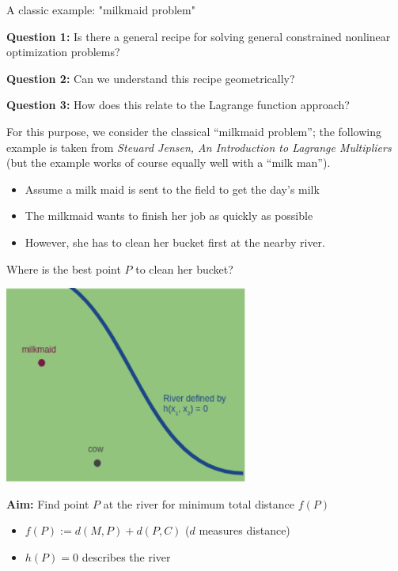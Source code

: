 \documentclass[11pt,compress,t,notes=noshow, xcolor=table]{beamer}
\begin{document}
\begin{vbframe}{A classic example: "milkmaid problem"}

\textbf{Question 1:} Is there a general recipe for solving general constrained nonlinear optimization problems? 

\textbf{Question 2:} Can we understand this recipe geometrically?

\textbf{Question 3:} How does this relate to the Lagrange function approach?

\lz
For this purpose, we consider the classical \enquote{milkmaid problem}; the following example is taken
from \textit{Steuard Jensen, An Introduction to Lagrange Multipliers} (but the example works
of course equally well with a \enquote{milk man}). 

\begin{itemize}
	\item Assume a milk maid is sent to the field to get the day's milk
	\item The milkmaid wants to finish her job as quickly as possible
	\item However, she has to clean her bucket first at the nearby river. 
\end{itemize}

\framebreak 
Where is the best point $P$ to clean her bucket?

\medskip

\begin{center}
	\includegraphics[width=0.6\textwidth]{figure_man/milkmaid1.png}
\end{center}

\framebreak 

\textbf{Aim:} Find point $P$ at the river for minimum total distance $f(P)$

\medskip

\begin{itemize} 
    \item $f(P) := d(M, P) + d(P, C)$ ($d$ measures distance)
    \item $h(P) = 0$ describes the river
\end{itemize}


\end{vbframe}
\end{document}

